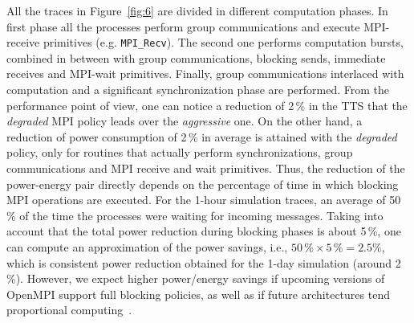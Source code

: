All  the  traces  in   Figure~\ref{fig:6}  are  divided  in  different
computation  phases. In first  phase all  the processes  perform group
communications      and       execute      MPI-receive      primitives
(e.g. \texttt{MPI\_Recv}). The second one performs computation bursts,
combined  in  between   with  group  communications,  blocking  sends,
immediate   receives   and   MPI-wait  primitives.    Finally,   group
communications   interlaced  with   computation   and  a   significant
synchronization  phase are  performed. From  the performance  point of
view,  one  can notice  a  reduction  of 2\,\%  in  the  TTS that  the
\emph{degraded} MPI  policy leads  over the \emph{aggressive}  one. On
the other hand,  a reduction of power consumption  of 2\,\% in average
is attained  with the \emph{degraded}  policy, only for  routines that
actually  perform  synchronizations,   group  communications  and  MPI
receive and wait primitives.   Thus, the reduction of the power-energy
pair directly depends on the  percentage of time in which blocking MPI
operations are executed. For  the 1-hour simulation traces, an average
of  50\,\%  of  the  time  the processes  were  waiting  for  incoming
messages.  Taking  into account that the total  power reduction during
blocking phases  is about 5\,\%,  one can compute an  approximation of
the  power savings,  i.e., $50\,\%  \times  5\,\% =  2.5\%$, which  is
consistent power  reduction obtained for the  1-day simulation (around
2\,\%).  However, we  expect higher  power/energy savings  if upcoming
versions  of OpenMPI  support full  blocking policies,  as well  as if
future architectures tend proportional computing~\citep{Barroso-2007}.



